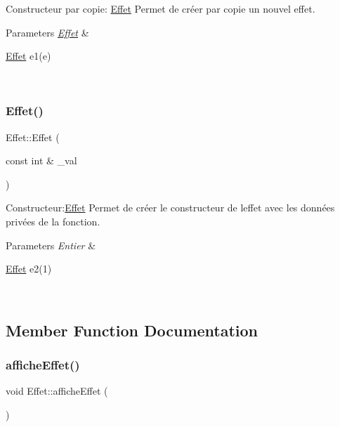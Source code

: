 Constructeur par copie\+: \hyperlink{classEffet}{Effet} Permet de créer par copie un nouvel effet. 


\begin{DoxyParams}{Parameters}
{\em \hyperlink{classEffet}{Effet}} & 
\begin{DoxyCode}
\hyperlink{classEffet}{Effet} e1(e)
\end{DoxyCode}
 \\
\hline
\end{DoxyParams}
\mbox{\label{classEffet_a29d6d24eaf9a773e74732919c5a4003a}} 
\subsubsection{\texorpdfstring{Effet()}{Effet()}\hspace{0.1cm}{\footnotesize\ttfamily [3/3]}}
{\footnotesize\ttfamily Effet\+::\+Effet (\begin{DoxyParamCaption}\item[{const int \&}]{\+\_\+val }\end{DoxyParamCaption})}



Constructeur\+:\hyperlink{classEffet}{Effet} Permet de créer le constructeur de l\textquotesingle{}effet avec les données privées de la fonction. 


\begin{DoxyParams}{Parameters}
{\em Entier} & 
\begin{DoxyCode}
\hyperlink{classEffet}{Effet} e2(1)
\end{DoxyCode}
 \\
\hline
\end{DoxyParams}


\subsection{Member Function Documentation}
\mbox{\label{classEffet_a038370be360fcb5e11f5d654e3506d42}} 
\subsubsection{\texorpdfstring{affiche\+Effet()}{afficheEffet()}}
{\footnotesize\ttfamily void Effet\+::affiche\+Effet (\begin{DoxyParamCaption}{ }\end{DoxyParamCaption})}



